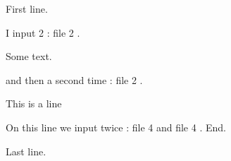 \documentclass[a4paper,oneside,11pt]{article}
\begin{document}
First line.


I input 2 : file 2
.

Some text.

and then a second time : file 2
.

This is a line

On this line we input twice : file 4
 and file 4
. End.

Last line.
\end{document}
